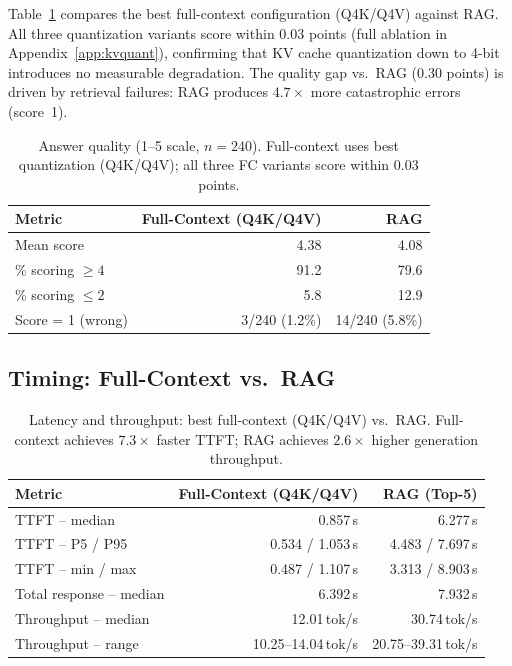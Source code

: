 \documentclass{article}
\begin{document}
Table~\ref{tab:quality} compares the best full-context configuration
(Q4K/Q4V) against RAG. All three quantization variants score within 0.03
points (full ablation in Appendix~\ref{app:kvquant}), confirming that KV
cache quantization down to 4-bit introduces no measurable degradation.
The quality gap vs.\ RAG (0.30 points) is driven by retrieval failures:
RAG produces $4.7\times$ more catastrophic errors (score~1).

\begin{table}[t]
\centering
\caption{Answer quality (1--5 scale, $n=240$). Full-context uses best
quantization (Q4K/Q4V); all three FC variants score within 0.03 points.}
\label{tab:quality}
\begin{tabular}{lrr}
\toprule
\textbf{Metric} & \textbf{Full-Context (Q4K/Q4V)} & \textbf{RAG} \\
\midrule
Mean score             & 4.38 & 4.08 \\
\% scoring $\geq 4$   & 91.2 & 79.6 \\
\% scoring $\leq 2$   & 5.8  & 12.9 \\
Score = 1 (wrong)      & 3/240 (1.2\%) & 14/240 (5.8\%) \\
\bottomrule
\end{tabular}
\end{table}

\subsection{Timing: Full-Context vs.\ RAG}

\begin{table}[t]
\centering
\caption{Latency and throughput: best full-context (Q4K/Q4V) vs.\ RAG.
Full-context achieves $7.3\times$ faster TTFT; RAG achieves $2.6\times$
higher generation throughput.}
\label{tab:timing}
\begin{tabular}{lrr}
\toprule
\textbf{Metric} & \textbf{Full-Context (Q4K/Q4V)} & \textbf{RAG (Top-5)} \\
\midrule
TTFT -- median           & 0.857\,s & 6.277\,s \\
TTFT -- P5 / P95         & 0.534 / 1.053\,s & 4.483 / 7.697\,s \\
TTFT -- min / max        & 0.487 / 1.107\,s & 3.313 / 8.903\,s \\
Total response -- median & 6.392\,s & 7.932\,s \\
Throughput -- median     & 12.01\,tok/s & 30.74\,tok/s \\
Throughput -- range      & 10.25--14.04\,tok/s & 20.75--39.31\,tok/s \\
\bottomrule
\end{tabular}
\end{table}
\end{document}
